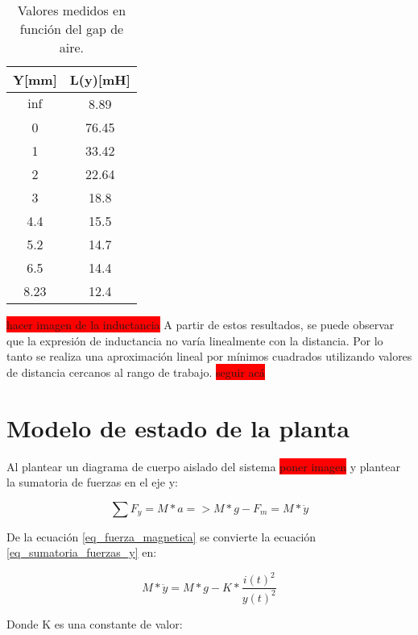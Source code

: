 \begin{table} [H]
	\begin{center}
		\begin{tabular}{| c | c |}
			\hline
			Y[mm] & L(y)[mH]\\ \hline
			$\inf$ & 8.89\\ \hline
			0 & 76.45\\ \hline
			1 & 33.42\\ \hline
			2 & 22.64\\ \hline
			3 & 18.8\\ \hline
			4.4 & 15.5\\ \hline
			5.2 & 14.7\\ \hline
			6.5 & 14.4\\ \hline
			8.23 & 12.4\\ \hline
		\end{tabular}
	\caption{Valores medidos en función del gap de aire.}
	\label{tab_mediciones_inductancia}
	\end{center}
\end{table}

\noindent \colorbox{red}{hacer imagen de la inductancia} A partir de estos resultados, se puede observar que la expresión de inductancia no varía linealmente con la distancia. Por lo tanto se realiza una aproximación lineal por mínimos cuadrados utilizando valores de distancia cercanos al rango de trabajo. \colorbox{red}{seguir acá}

\section{Modelo de estado de la planta}

\noindent Al plantear un diagrama de cuerpo aislado del sistema \colorbox{red}{poner imagen} y plantear la sumatoria de fuerzas en el eje y:

\begin{equation}\label{eq_sumatoria_fuerzas_y}
	\sum F_{y}=M*a=>M*g-F_{m}=M*\ddot{y}
\end{equation}

\noindent De la ecuación \ref{eq_fuerza_magnetica} se convierte la ecuación \ref{eq_sumatoria_fuerzas_y} en:

\begin{equation}\label{eq_sumatoria_fuerzas_y_2}
	M*\ddot{y}=M*g-K*\frac{i(t)^{2}}{y(t)^{2}}
\end{equation}

\noindent Donde K es una constante de valor:

